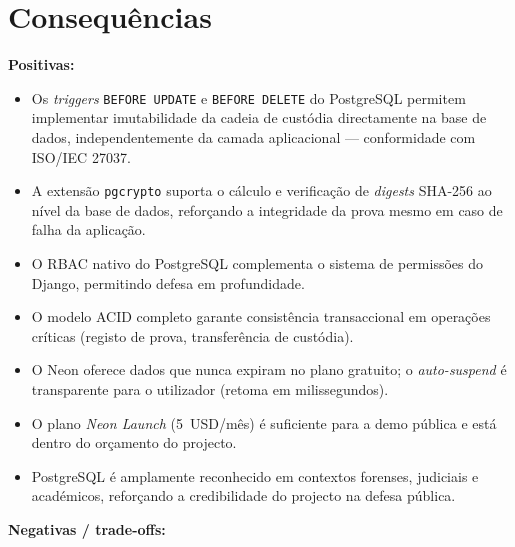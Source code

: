 \documentclass[a4paper,11pt]{article}
\begin{document}
\section{Consequências}

\textbf{Positivas:}

\begin{itemize}[nosep, leftmargin=*]
    \item Os \emph{triggers} \texttt{BEFORE UPDATE} e \texttt{BEFORE DELETE}
    do PostgreSQL permitem implementar imutabilidade da cadeia de custódia
    directamente na base de dados, independentemente da camada aplicacional
    --- conformidade com ISO/IEC 27037.

    \item A extensão \texttt{pgcrypto} suporta o cálculo e verificação de
    \emph{digests} SHA-256 ao nível da base de dados, reforçando a
    integridade da prova mesmo em caso de falha da aplicação.

    \item O RBAC nativo do PostgreSQL complementa o sistema de permissões
    do Django, permitindo defesa em profundidade.

    \item O modelo ACID completo garante consistência transaccional em
    operações críticas (registo de prova, transferência de custódia).

    \item O Neon oferece dados que nunca expiram no plano gratuito; o
    \emph{auto-suspend} é transparente para o utilizador (retoma em
    milissegundos).

    \item O plano \emph{Neon Launch} (5~USD/mês) é suficiente para a demo
    pública e está dentro do orçamento do projecto.

    \item PostgreSQL é amplamente reconhecido em contextos forenses, judiciais
    e académicos, reforçando a credibilidade do projecto na defesa pública.
\end{itemize}

\textbf{Negativas / trade-offs:}
\end{document}
